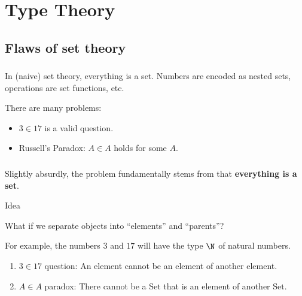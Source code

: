 
\section{Type Theory}

\subsection{Flaws of set theory}
\begin{frame}\frametitle{\insertsubsection}

In (naive) set theory, everything is a set. Numbers are encoded as nested sets, operations are set functions, etc.

There are many problems:

\begin{itemize}

\item \(3 \in 17\) is a valid question.

\item Russell's Paradox: \(A \in A\) holds for some \(A\).

\end{itemize}

\end{frame}




\begin{frame}\frametitle{\insertsubsection}

Slightly absurdly, the problem fundamentally stems from that \textbf{everything is a set}.

\begin{exampleblock}{Idea}

What if we separate objects into ``elements'' and ``parents''?

\end{exampleblock}

For example, the numbers \(3\) and \(17\) will have the type \(\N\) of natural numbers.

\begin{enumerate}
  \item \(3 \in 17\) question: An element cannot be an element of another element.
  \item \(A \in A\) paradox: There cannot be a \(\textrm{Set}\) that is an element of another \(\textrm{Set}\).
\end{enumerate}

\end{frame}




